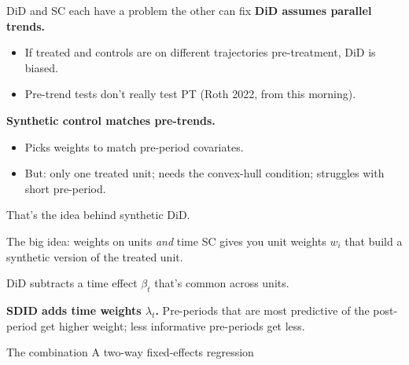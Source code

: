 \documentclass[aspectratio=169,11pt]{beamer}
\begin{document}
\begin{frame}{DiD and SC each have a problem the other can fix}
\vspace{0.5em}
\textbf{DiD assumes parallel trends.} \;
\begin{itemize}\small
  \item If treated and controls are on different trajectories pre-treatment, DiD is biased.
  \item Pre-trend tests don't really test PT (Roth 2022, from this morning).
\end{itemize}

\vspace{0.6em}
\textbf{Synthetic control matches pre-trends.} \;
\begin{itemize}\small
  \item Picks weights to match pre-period covariates.
  \item But: only one treated unit; needs the convex-hull condition; struggles with short pre-period.
\end{itemize}

\vspace{0.7em}
 \;That's the idea behind synthetic DiD.

\vspace{0.3em}
\end{frame}

\begin{frame}{The big idea: weights on units \textit{and} time}
\vspace{0.7em}
SC gives you unit weights $w_i$ that build a synthetic version of the treated unit.

\vspace{0.5em}
DiD subtracts a time effect $\beta_t$ that's common across units.

\vspace{0.7em}
\textbf{SDID adds time weights $\lambda_t$.} \;Pre-periods that are most predictive of the post-period get higher weight; less informative pre-periods get less.

\vspace{0.6em}
\begin{block}{The combination}
\centering
A two-way fixed-effects regression \;
\end{block}

\vspace{0.4em}
\end{frame}
\end{document}
